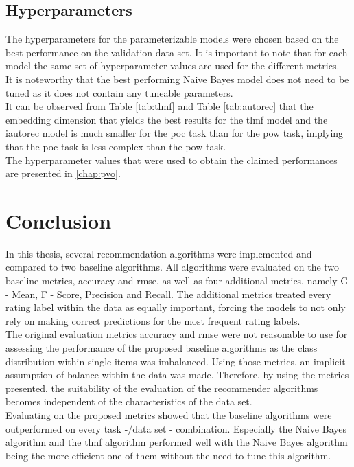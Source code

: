 \subsection{Hyperparameters}
\label{chap:hyperparams}
The hyperparameters for the parameterizable models were chosen based on the best performance on the validation data set. It is important to note that for each model the same set of hyperparameter values are used for the different metrics.\\
It is noteworthy that the best performing Naive Bayes model does not need to be tuned as it does not contain any tuneable parameters.\\
It can be observed from Table \ref{tab:tlmf} and Table \ref{tab:autorec} that the embedding dimension that yields the best results for the \acrshort{tlmf} model and the \acrshort{iautorec} model is much smaller for the \acrshort{poc} task than for the \acrshort{pow} task, implying that the \acrshort{poc} task is less complex than the \acrshort{pow} task.\\ 
The hyperparameter values that were used to obtain the claimed performances are presented in \ref{chap:pvo}.

\section{Conclusion}
\label{chap:conclusion}
In this thesis, several recommendation algorithms were implemented and compared to two baseline algorithms. All algorithms were evaluated on the two baseline metrics, accuracy and rmse, as well as four additional metrics, namely G - Mean, F - Score, Precision and Recall. The additional metrics treated every rating label within the data as equally important, forcing the models to not only rely on making correct predictions for the most frequent rating labels.\\
The original evaluation metrics accuracy and rmse were not reasonable to use for assessing the performance of the proposed baseline algorithms as the class distribution within single items was imbalanced. Using those metrics, an implicit assumption of balance within the data was made. Therefore, by using the metrics presented, the suitability of the evaluation of the recommender algorithms becomes independent of the characteristics of the data set.\\
Evaluating on the proposed metrics showed that the baseline algorithms were outperformed on every task -/data set - combination. Especially the Naive Bayes algorithm and the \acrshort{tlmf} algorithm performed well with the Naive Bayes algorithm being the more efficient one of them without the need to tune this algorithm.\\

